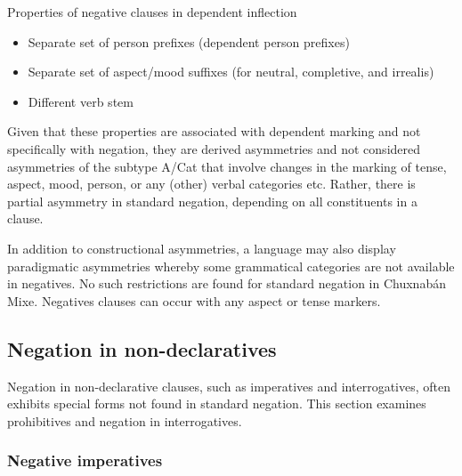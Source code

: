 \documentclass[output=paper,colorlinks,citecolor=brown,draft]{langscibook}
\begin{document}
\ea\label{ex:mix:extra}
Properties of negative clauses in dependent inflection
\begin{itemize}[noitemsep]%
    \item Separate set of person prefixes (dependent person prefixes)
    \item Separate set of aspect/mood suffixes (for neutral, completive, and irrealis)
    \item Different verb stem 
\end{itemize}
\z

Given that these properties are associated with dependent marking and not specifically with negation, they are derived asymmetries and not considered asymmetries of the subtype A/Cat \citep{Miestamo2013-wals114} that involve changes in the marking of tense, aspect, mood, person, or any (other) verbal categories etc. Rather, there is partial asymmetry in standard negation, depending on all constituents in a clause.

In addition to constructional asymmetries, a language may also display paradigmatic asymmetries \citep{Miestamo2005,Miestamo2007,Miestamo2009neg.pragmatics,Miestamo2014,Miestamo2017} whereby some grammatical categories are not available in negatives. No such restrictions are found for standard negation in Chuxnabán Mixe. Negatives clauses can occur with any aspect or tense markers. 

\subsection{Negation in non-declaratives}\label{sec:mix:2.2}

Negation in non-declarative clauses, such as imperatives and interrogatives, often exhibits special forms not found in standard negation. This section examines prohibitives and negation in interrogatives.

\subsubsection{Negative imperatives}\label{sec:mix:2.2.1}
\end{document}
